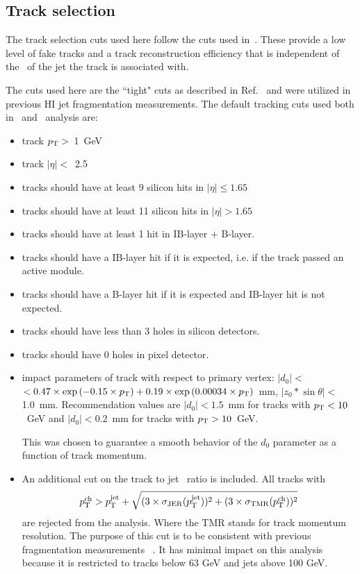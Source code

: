 \subsection{Track selection}
\label{sec:trackselection}

The track selection cuts used here follow the cuts used in~\cite{PhysRevC.98.024908}.
These provide a low level of fake tracks and 
a track reconstruction efficiency that is independent of the \pt\ of the jet the track is associated with.
 
The cuts used here are the ``tight" cuts as described in Ref.~\cite{ref:tracktwiki} and were utilized in previous HI jet fragmentation measurements.
The default tracking cuts used both in \pp\ and \PbPb\ analysis are:
\begin{itemize}
\item{ track $\mbox{$p_{\mathrm{T}}$}>$~1~GeV}
\item{ track $|\eta|<$~2.5}
\item{ tracks should have at least 9 silicon hits in $|\eta|\leq1.65$}
\item{ tracks should have at least 11 silicon hits in $|\eta|>1.65$}
\item{ tracks should have at least 1 hit in IB-layer + B-layer.}
\item{tracks should have a IB-layer hit if it is expected, i.e.
if the track passed an active module.}
\item{tracks should have a B-layer hit if it is expected and IB-layer hit is not expected.}
\item{ tracks should have  less than 3 holes in silicon detectors.}
\item{ tracks should have 0 holes in pixel detector.}
\item{impact parameters of track with respect to primary vertex:  $|d_0|<$$< 0.47\times \exp{(-0.15\times\mbox{$p_{\mathrm{T}}$})} + 0.19\times \exp{(0.00034\times\mbox{$p_{\mathrm{T}}$})}$~mm, $|z_0*\sin\theta|<$1.0~mm.
Recommendation values are  $|d_0| < 1.5$~mm for tracks with $\mbox{$p_{\mathrm{T}}$}<10$~GeV and $|d_0| < 0.2$~mm for tracks with $\mbox{$p_{\mathrm{T}}$}>10$~GeV.
  	
  	This was chosen to guarantee a smooth behavior of the $d_{0}$ parameter as a function of track momentum.
}
\item{ An additional cut on the track to jet \pT\ ratio is included.
All tracks with 
\begin{equation}
\mbox{$p_{{\mathrm{T}}}^{\mathrm{ch}}$} >  \mbox{$p_{\mathrm{T}}^{\mathrm{jet}}$} + \sqrt{ (3 \times \sigma_{\mathrm{JER}}(\mbox{$p_{\mathrm{T}}^{\mathrm{jet}}$}))^2 + (3 \times \sigma_{\mathrm{TMR}}(\mbox{$p_{{\mathrm{T}}}^{\mathrm{ch}}$}))^2} 
\end{equation}
are rejected from the analysis.
Where the TMR stands for track momentum resolution.
The purpose of this cut is to be consistent with previous fragmentation measurements ~\cite{PhysRevC.98.024908}.
It has minimal impact on this analysis because it is restricted to tracks below 63 GeV and jets above 100 GeV.
}
\end{itemize}

